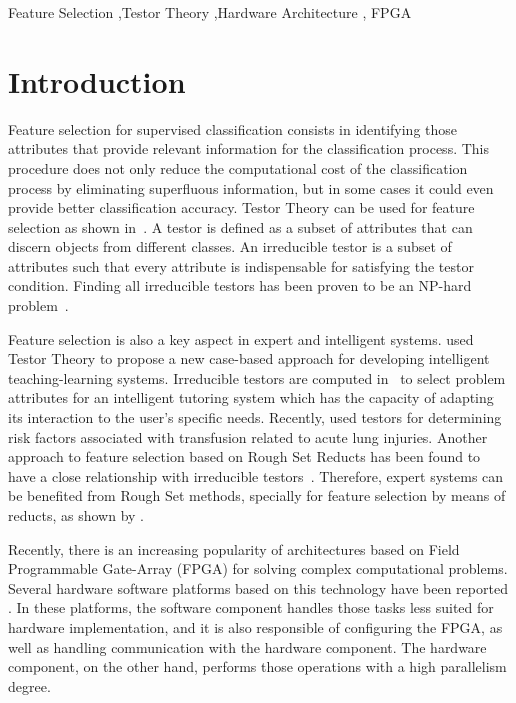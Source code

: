 \documentclass[authoryear,preprint,review,12pt]{elsarticle}
\begin{document}
\begin{frontmatter}
\begin{abstract}
\end{abstract}

\begin{keyword}
Feature Selection \sep Testor Theory \sep Hardware Architecture \sep
FPGA

\end{keyword}

\end{frontmatter}


\section{Introduction}
\label{sect:1}

Feature selection for supervised classification consists in identifying those attributes that 
provide relevant information for the classification process. This procedure does not only reduce the 
computational cost of the classification process by eliminating superfluous information, but in some cases 
it could even provide better classification accuracy. 
Testor Theory can be used for feature selection as shown in~\citep{R27,R5}. A testor is defined as a subset 
of attributes that can discern objects from different classes. An irreducible testor is a subset of attributes 
such that every attribute is indispensable for satisfying the testor condition. Finding all irreducible 
testors has been proven to be an NP-hard problem~\citep{R40}.

Feature selection is also a key aspect in expert and intelligent systems. \cite{Mart07} used Testor Theory to
propose a new case-based approach for developing intelligent teaching-learning systems.  Irreducible testors
are computed in~\citep{Med07} to select problem attributes for an intelligent tutoring system 
which has the capacity of adapting its interaction to the user's specific needs. Recently, \cite{Torr14} used 
testors for determining risk factors associated with transfusion related to acute lung injuries. Another approach to 
feature selection based on Rough Set Reducts has been found to have a close relationship with irreducible 
testors~\citep{Lazo15}. Therefore, expert systems can be benefited from Rough Set methods, specially for 
feature selection by means of reducts, as shown by \cite{Yah00}.

Recently, there is an increasing popularity of architectures based on Field Programmable Gate-Array (FPGA) 
for solving complex computational problems. Several hardware software platforms based on this technology have 
been reported \citep{R29,R30}. 
In these platforms, the software component handles those tasks less suited for hardware implementation, 
and it is also responsible of configuring the FPGA, as well as handling communication with the hardware component. 
The hardware component, on the other hand, performs those operations with a high parallelism degree.
\end{document}
